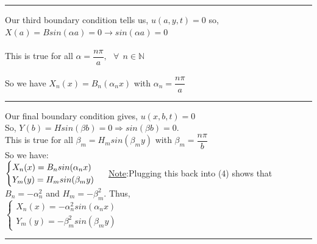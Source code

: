 \documentclass[fleqn]{article}
\begin{document}
\begin{enumerate}
\begin{enumerate}
      \textcolor{hwColor}{ 
        \rule{16cm}{1pt} 
      }

      \textcolor{hwColor}{ 
        Our third boundary condition tells us, $u(a,y,t)=0$ so, $X(a)=Bsin(\alpha a)=0 \rightarrow sin(\alpha a)=0$ \\
        \\
        This is true for all $\alpha=\dfrac{n \pi}{a}, ~~~ \forall ~~ n\in \mathbb{N}$ \\
        \\
        So we have $X_n(x)=B_n(\alpha_n x)$ with $\alpha_n=\dfrac{n \pi}{a}$
      }

      \textcolor{hwColor}{ 
        \rule{16cm}{1pt} 
      }

      \textcolor{hwColor}{ 
        Our final boundary condition gives, $u(x,b,t)=0$ \\
        So, $Y(b)=Hsin(\beta b)=0 \Longrightarrow sin(\beta b)=0$. \\
        This is true for all $\beta_m=H_m sin(\beta_m y)$ with $\beta_m=\dfrac{n \pi}{b}$ \\
        So we have: \\
        $
          \begin{cases}
            X_n(x)=B_n sin(\alpha_n x) \\
            Y_m(y)=H_m sin(\beta_m y)
          \end{cases} \\
          \\
        $
        \underline{Note}:Plugging this back into (4) shows that $B_n=-\alpha_n^2$ and $H_m=-\beta_m^2$. Thus, \\
        $
          \begin{cases}
            X_n(x)=-\alpha_n^2 sin(\alpha_n x) \\
            Y_m(y)=-\beta_m^2 sin(\beta_m y)
          \end{cases}
        $
      }

      \textcolor{hwColor}{ 
        \rule{16cm}{1pt} 
      }


\end{enumerate}
\end{enumerate}
\end{document}
